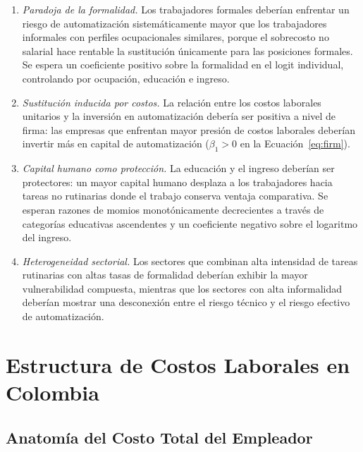 \documentclass{article}
\begin{document}
\begin{enumerate}[label=\textbf{P\arabic*:}]
\item \textit{Paradoja de la formalidad.} Los trabajadores formales deber\'ian enfrentar un riesgo de automatizaci\'on sistem\'aticamente mayor que los trabajadores informales con perfiles ocupacionales similares, porque el sobrecosto no salarial hace rentable la sustituci\'on \'unicamente para las posiciones formales. Se espera un coeficiente positivo sobre la formalidad en el logit individual, controlando por ocupaci\'on, educaci\'on e ingreso.
\item \textit{Sustituci\'on inducida por costos.} La relaci\'on entre los costos laborales unitarios y la inversi\'on en automatizaci\'on deber\'ia ser positiva a nivel de firma: las empresas que enfrentan mayor presi\'on de costos laborales deber\'ian invertir m\'as en capital de automatizaci\'on ($\beta_1 > 0$ en la Ecuaci\'on~\ref{eq:firm}).
\item \textit{Capital humano como protecci\'on.} La educaci\'on y el ingreso deber\'ian ser protectores: un mayor capital humano desplaza a los trabajadores hacia tareas no rutinarias donde el trabajo conserva ventaja comparativa. Se esperan razones de momios monot\'onicamente decrecientes a trav\'es de categor\'ias educativas ascendentes y un coeficiente negativo sobre el logaritmo del ingreso.
\item \textit{Heterogeneidad sectorial.} Los sectores que combinan alta intensidad de tareas rutinarias con altas tasas de formalidad deber\'ian exhibir la mayor vulnerabilidad compuesta, mientras que los sectores con alta informalidad deber\'ian mostrar una desconexi\'on entre el riesgo t\'ecnico y el riesgo efectivo de automatizaci\'on.
\end{enumerate}


\FloatBarrier

\section{Estructura de Costos Laborales en Colombia}
\label{sec:labor_costs}

\subsection{Anatom\'ia del Costo Total del Empleador}
\label{subsec:cost_anatomy}
\end{document}

